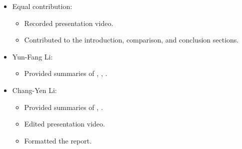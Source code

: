 \begin{itemize}
    \item Equal contribution:
    \begin{itemize}
        \item Recorded presentation video.
        \item Contributed to the introduction, comparison, and conclusion sections.
    \end{itemize}

    \item Yun-Fang Li: 
    \begin{itemize}
        \item Provided summaries of \cite{shao2023reasonnet}, \cite{shao2023safety}, \cite{jaeger2023hidden}.
    \end{itemize}

    \item Chang-Yen Li:
    \begin{itemize}
        \item Provided summaries of \cite{jaeger2023hidden}, \cite{wu2022trajectory}.
        \item Edited presentation video.
        \item Formatted the report.
    \end{itemize}
\end{itemize}